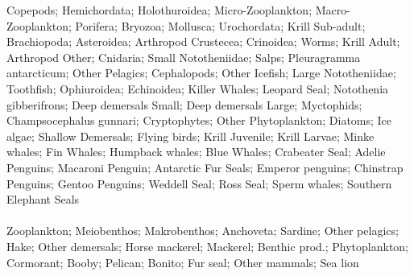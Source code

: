 Copepods; Hemichordata; Holothuroidea; Micro-Zooplankton; Macro-Zooplankton; Porifera; Bryozoa; Mollusca; Urochordata; Krill Sub-adult; Brachiopoda; Asteroidea; Arthropod Crustecea; Crinoidea; Worms; Krill Adult; Arthropod Other; Cnidaria; Small Nototheniidae; Salps; Pleuragramma antarcticum; Other Pelagics; Cephalopods; Other Icefish; Large Nototheniidae; Toothfish; Ophiuroidea; Echinoidea; Killer Whales; Leopard Seal; Notothenia gibberifrons; Deep demersals Small; Deep demersals Large; Myctophids; Champsocephalus gunnari; Cryptophytes; Other Phytoplankton; Diatoms; Ice algae; Shallow Demersals; Flying birds; Krill Juvenile; Krill Larvae; Minke whales; Fin Whales; Humpback whales; Blue Whales; Crabeater Seal; Adelie Penguins; Macaroni Penguin; Antarctic Fur Seals; Emperor penguins; Chinstrap Penguins; Gentoo Penguins; Weddell Seal; Ross Seal; Sperm whales; Southern Elephant Seals\\
\fullhline
\hline
{} \\
\hline
Zooplankton; Meiobenthos; Makrobenthos; Anchoveta; Sardine; Other pelagics; Hake; Other demersals; Horse mackerel; Mackerel; Benthic prod.; Phytoplankton; Cormorant; Booby; Pelican; Bonito; Fur seal; Other mammals; Sea lion\\
\fullhline
\hline
{} \\
\hline
